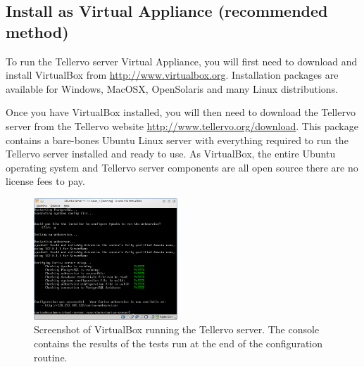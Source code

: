 \subsection[Install as Virtual Appliance]{Install as Virtual Appliance (recommended method)}
\label{txt:virtualAppliance}
To run the Tellervo server Virtual Appliance, you will first need to download and install VirtualBox from \url{http://www.virtualbox.org}.  Installation packages are available for Windows, MacOSX, OpenSolaris and many Linux distributions.

Once you have VirtualBox installed, you will then need to download the Tellervo server from the Tellervo website \url{http://www.tellervo.org/download}.  This package contains a bare-bones Ubuntu Linux server with everything required to run the Tellervo server installed and ready to use.  As VirtualBox, the entire Ubuntu operating system and Tellervo server components are all open source there are no license fees to pay.

\begin{figure}
  \begin{center}
    \includegraphics[width=0.48\textwidth]{Images/serverconfig.png}
  \end{center}
  \caption{Screenshot of VirtualBox running the Tellervo server.  The console contains the results of the tests run at the end of the configuration routine.}
  \label{fig:serverconfig}
\end{figure}

